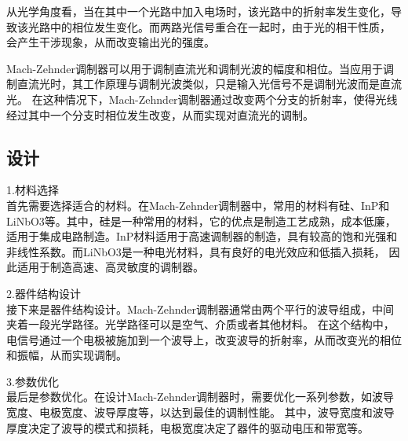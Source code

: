 \documentclass[12pt, a4paper, oneside]{article}
\begin{document}
\begin{spacing}{2.0}
从光学角度看，当在其中一个光路中加入电场时，该光路中的折射率发生变化，导致该光路中的相位发生变化。而两路光信号重合在一起时，由于光的相干性质，
会产生干涉现象，从而改变输出光的强度。

Mach-Zehnder调制器可以用于调制直流光和调制光波的幅度和相位。当应用于调制直流光时，其工作原理与调制光波类似，只是输入光信号不是调制光波而是直流光。
在这种情况下，Mach-Zehnder调制器通过改变两个分支的折射率，使得光线经过其中一个分支时相位发生改变，从而实现对直流光的调制。
\subsection{设计}
1.材料选择\\
首先需要选择适合的材料。在Mach-Zehnder调制器中，常用的材料有硅、InP和LiNbO3等。其中，硅是一种常用的材料，它的优点是制造工艺成熟，成本低廉，
适用于集成电路制造。InP材料适用于高速调制器的制造，具有较高的饱和光强和非线性系数。而LiNbO3是一种电光材料，具有良好的电光效应和低插入损耗，
因此适用于制造高速、高灵敏度的调制器。

2.器件结构设计\\
接下来是器件结构设计。Mach-Zehnder调制器通常由两个平行的波导组成，中间夹着一段光学路径。光学路径可以是空气、介质或者其他材料。
在这个结构中，电信号通过一个电极被施加到一个波导上，改变波导的折射率，从而改变光的相位和振幅，从而实现调制。

3.参数优化\\
最后是参数优化。在设计Mach-Zehnder调制器时，需要优化一系列参数，如波导宽度、电极宽度、波导厚度等，以达到最佳的调制性能。
其中，波导宽度和波导厚度决定了波导的模式和损耗，电极宽度决定了器件的驱动电压和带宽等。


\end{spacing}
\end{document}
